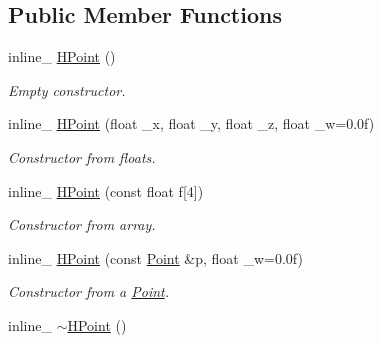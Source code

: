 \subsection*{Public Member Functions}
\begin{DoxyCompactItemize}
\item 
inline\+\_\+ \hyperlink{classHPoint_a5e3fe1aeb8ff13965d728803c7c6483c}{H\+Point} ()\hypertarget{classHPoint_a5e3fe1aeb8ff13965d728803c7c6483c}{}\label{classHPoint_a5e3fe1aeb8ff13965d728803c7c6483c}

\begin{DoxyCompactList}\small\item\em Empty constructor. \end{DoxyCompactList}\item 
inline\+\_\+ \hyperlink{classHPoint_ad7facedfb7132b6cffb9e6cd701aef0c}{H\+Point} (float \+\_\+x, float \+\_\+y, float \+\_\+z, float \+\_\+w=0.\+0f)\hypertarget{classHPoint_ad7facedfb7132b6cffb9e6cd701aef0c}{}\label{classHPoint_ad7facedfb7132b6cffb9e6cd701aef0c}

\begin{DoxyCompactList}\small\item\em Constructor from floats. \end{DoxyCompactList}\item 
inline\+\_\+ \hyperlink{classHPoint_a9735769e9ac56ee78ff4894b958eeb33}{H\+Point} (const float f\mbox{[}4\mbox{]})\hypertarget{classHPoint_a9735769e9ac56ee78ff4894b958eeb33}{}\label{classHPoint_a9735769e9ac56ee78ff4894b958eeb33}

\begin{DoxyCompactList}\small\item\em Constructor from array. \end{DoxyCompactList}\item 
inline\+\_\+ \hyperlink{classHPoint_a9e7098725fdb57d522055922b901cbb5}{H\+Point} (const \hyperlink{classPoint}{Point} \&p, float \+\_\+w=0.\+0f)\hypertarget{classHPoint_a9e7098725fdb57d522055922b901cbb5}{}\label{classHPoint_a9e7098725fdb57d522055922b901cbb5}

\begin{DoxyCompactList}\small\item\em Constructor from a \hyperlink{classPoint}{Point}. \end{DoxyCompactList}\item 
inline\+\_\+ \hyperlink{classHPoint_af759f777bf37fff8a540bf28f6d763ae}{$\sim$\+H\+Point} ()\hypertarget{classHPoint_af759f777bf37fff8a540bf28f6d763ae}{}\label{classHPoint_af759f777bf37fff8a540bf28f6d763ae}


\end{DoxyCompactItemize}
